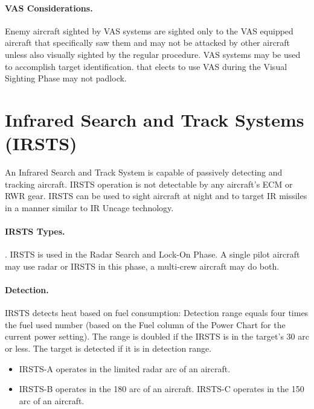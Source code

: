 \begin{advancedrules}
\paragraph{VAS Considerations.} Enemy aircraft sighted by VAS systems are sighted only to the VAS equipped aircraft that specifically saw them and may not be attacked by other aircraft unless also visually sighted by the regular procedure. VAS systems may be used to accomplish target identification.  that elects to use VAS during the Visual Sighting Phase may not padlock.


\section{Infrared Search and Track Systems (IRSTS)}
\label{rule:irsts}

An Infrared Search and Track System is capable of passively detecting and tracking aircraft. IRSTS operation is not detectable by any aircraft's ECM or RWR gear. IRSTS can be used to sight aircraft at night and to target IR missiles in a manner similar to IR Uncage technology.

\paragraph{IRSTS Types.} . IRSTS is used in the Radar Search and Lock-On Phase. A single pilot aircraft may use radar or IRSTS in this phase, a multi-crew aircraft may do both. 

\paragraph{Detection.} IRSTS detects heat based on fuel consumption: Detection range equals four times the fuel used number (based on the Fuel column of the Power Chart for the current power setting). The range is doubled if the IRSTS is in the target's 30{\deg} arc or less. The target is detected if it is in detection range.

\begin{itemize}
    \item IRSTS-A operates in the limited radar arc of an aircraft.
    \item IRSTS-B operates in the 180{\deg} arc of an aircraft.
     IRSTS-C operates in the 150{\deg} arc of an aircraft.
\end{itemize}


\end{advancedrules}
